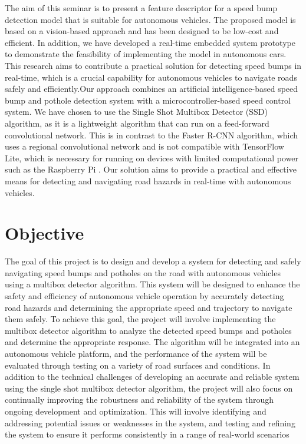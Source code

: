 \noindent
The aim of this seminar is to present a feature descriptor for a speed bump detection model that is suitable for autonomous vehicles. The proposed model is based on a vision-based approach and has been designed to be low-cost and efficient. In addition, we have developed a real-time embedded system prototype to demonstrate the feasibility of implementing the model in autonomous cars. This research aims to contribute a practical solution for detecting speed bumps in real-time, which is a crucial capability for autonomous vehicles to navigate roads safely and efficiently.Our approach combines an artificial intelligence-based speed bump and pothole detection system with a microcontroller-based speed control system. We have chosen to use the Single Shot Multibox Detector (SSD) algorithm, as it is a lightweight algorithm that can run on a feed-forward convolutional network. This is in contrast to the Faster R-CNN algorithm, which uses a regional convolutional network and is not compatible with TensorFlow Lite, which is necessary for running on devices with limited computational power such as the Raspberry Pi \cite{R1}. Our solution aims to provide a practical and effective means for detecting and navigating road hazards in real-time with autonomous vehicles.
\section{Objective}
The goal of this project is to design and develop a system for detecting and safely navigating speed bumps and potholes on the road with autonomous vehicles using a multibox detector algorithm. This system will be designed to enhance the safety and efficiency of autonomous vehicle operation by accurately detecting road hazards and determining the appropriate speed and trajectory to navigate them safely. To achieve this goal, the project will involve implementing the multibox detector algorithm to analyze the detected speed bumps and potholes and determine the appropriate response. The algorithm will be integrated into an autonomous vehicle platform, and the performance of the system will be evaluated through testing on a variety of road surfaces and conditions.
\noindent
In addition to the technical challenges of developing an accurate and reliable system using the single shot multibox detector algorithm, the project will also focus on continually improving the robustness and reliability of the system through ongoing development and optimization. This will involve identifying and addressing potential issues or weaknesses in the system, and testing and refining the system to ensure it performs consistently in a range of real-world scenarios
